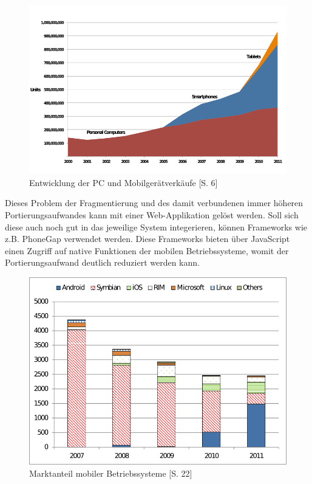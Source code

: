\documentclass[a4paper,bibtotoc,oneside]{scrbook}
\begin{document}
\begin{figure}[h!]
\centering
\includegraphics[width=150mm]{img/globaldevicesales.png}
\caption[Entwicklung der PC und Mobilgerätverkäufe]{Entwicklung der PC und Mobilgerätverkäufe \cite{devicesales}[S. 6]}\label{Abb1}
\end{figure}

Dieses Problem der Fragmentierung und des damit verbundenen immer höheren Portierungsaufwandes kann mit einer Web-Applikation gelöst werden. Soll sich diese auch noch gut in das jeweilige System integerieren, können Frameworks wie z.B. PhoneGap \cite{phonegap} verwendet werden. Diese Frameworks bieten über JavaScript einen Zugriff auf native Funktionen der mobilen Betriebssysteme, womit der Portierungsaufwand deutlich reduziert werden kann.

\begin{figure}[h!]
\centering
\includegraphics[width=130mm]{img/operatingsystems.png}
\caption[Marktanteil mobiler Betriebssysteme]{Marktanteil mobiler Betriebssysteme \cite{smartphone}[S. 22]}\label{Abb2}
\end{figure}
\end{document}
